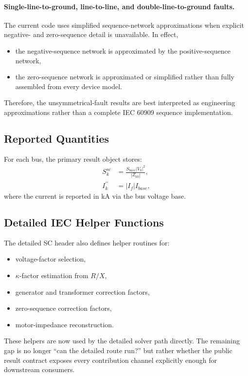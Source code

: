 \paragraph{Single-line-to-ground, line-to-line, and double-line-to-ground faults.}
The current code uses simplified sequence-network approximations when explicit
negative- and zero-sequence detail is unavailable.  In effect,
\begin{itemize}
  \item the negative-sequence network is approximated by the positive-sequence network,
  \item the zero-sequence network is approximated or simplified rather than fully assembled from every device model.
\end{itemize}
Therefore, the unsymmetrical-fault results are best interpreted as engineering
approximations rather than a complete IEC 60909 sequence implementation.

\subsection{Reported Quantities}

For each bus, the primary result object stores:
\begin{align}
S_k^{sc} &= \frac{S_{base}|V_0|^2}{|Z_{kk}|}, \\
I_{k}^{\prime\prime} &= |I_f| I_{base},
\end{align}
where the current is reported in kA via the bus voltage base.

\subsection{Detailed IEC Helper Functions}

The detailed SC header also defines helper routines for:
\begin{itemize}
  \item voltage-factor selection,
  \item \(\kappa\)-factor estimation from \(R/X\),
  \item generator and transformer correction factors,
  \item zero-sequence correction factors,
  \item motor-impedance reconstruction.
\end{itemize}
These helpers are now used by the detailed solver path directly.  The remaining
gap is no longer ``can the detailed route run?'' but rather whether the public
result contract exposes every contribution channel explicitly enough for
downstream consumers.


